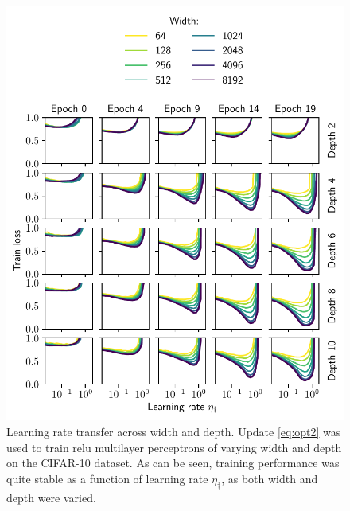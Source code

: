 \begin{refsection}
\begin{figure}[p]
    \centering
    \includegraphics{figures/landscape.pdf}
    \caption[Learning rate transfer across width and depth]{Learning rate transfer across width and depth. Update \ref{eq:opt2} was used to train relu multilayer perceptrons of varying width and depth on the CIFAR-10 dataset. As can be seen, training performance was quite stable as a function of learning rate $\eta_\dagger$, as both width and depth were varied.}
    \label{fig:width-depth}
\end{figure}
\begin{figure}[p]
    \centering

\end{figure}
\end{refsection}
